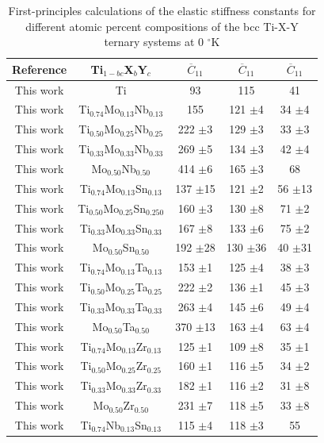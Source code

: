 \newpage
\begin{longtable}[H]{ c c c c c}
	\caption{First-principles calculations of the elastic stiffness constants for different atomic percent compositions of the bcc Ti-X-Y ternary systems at 0 $^{\circ}$K} 	\label{Ch6-table:tixyecijdata} \\
	\hline
	Reference & Ti$_{1-bc}$X$_b$Y$_c$ & $\overline{C}_{11}$ & $\overline{C}_{11}$ & $\overline{C}_{11}$ \\
	\hline
	\endhead
	\hline
	\endfoot
	This work & Ti & 93 & 115 & 41 \\
	This work & Ti$_{0.74}$Mo$_{0.13}$Nb$_{0.13}$ & 155 & 121 $\pm$4 & 34 $\pm$4 \\
	This work & Ti$_{0.50}$Mo$_{0.25}$Nb$_{0.25}$ & 222 $\pm$3 & 129 $\pm$3 & 33 $\pm$3 \\
	This work & Ti$_{0.33}$Mo$_{0.33}$Nb$_{0.33}$ & 269 $\pm$5 & 134 $\pm$3 & 42 $\pm$4 \\
	This work & Mo$_{0.50}$Nb$_{0.50}$ & 414 $\pm$6 & 165 $\pm$3 & 68 \\
	This work & Ti$_{0.74}$Mo$_{0.13}$Sn$_{0.13}$ & 137 $\pm$15 & 121 $\pm$2 & 56 $\pm$13 \\
	This work & Ti$_{0.50}$Mo$_{0.25}$Sn$_{0.250}$ & 160 $\pm$3 & 130 $\pm$8 & 71 $\pm$2 \\
	This work & Ti$_{0.33}$Mo$_{0.33}$Sn$_{0.33}$ & 167 $\pm$8 & 133 $\pm$6 & 75 $\pm$2 \\
	This work & Mo$_{0.50}$Sn$_{0.50}$ & 192 $\pm$28 & 130 $\pm$36 & 40 $\pm$31 \\
	This work & Ti$_{0.74}$Mo$_{0.13}$Ta$_{0.13}$ & 153 $\pm$1 & 125 $\pm$4 & 38 $\pm$3 \\
	This work & Ti$_{0.50}$Mo$_{0.25}$Ta$_{0.25}$ & 222 $\pm$2 & 136 $\pm$1 & 45 $\pm$3 \\
	This work & Ti$_{0.33}$Mo$_{0.33}$Ta$_{0.33}$ & 263 $\pm$4 & 145 $\pm$6 & 49 $\pm$4 \\
	This work & Mo$_{0.50}$Ta$_{0.50}$ & 370 $\pm$13 & 163 $\pm$4 & 63 $\pm$4 \\
	This work & Ti$_{0.74}$Mo$_{0.13}$Zr$_{0.13}$ & 125 $\pm$1 & 109 $\pm$8 & 35 $\pm$1 \\
	This work & Ti$_{0.50}$Mo$_{0.25}$Zr$_{0.25}$ & 160 $\pm$1 & 116 $\pm$5 & 34 $\pm$2 \\
	This work & Ti$_{0.33}$Mo$_{0.33}$Zr$_{0.33}$ & 182 $\pm$1 & 116 $\pm$2 & 31 $\pm$8 \\
	This work & Mo$_{0.50}$Zr$_{0.50}$ & 231 $\pm$7 & 118 $\pm$5 & 33 $\pm$8 \\
	This work & Ti$_{0.74}$Nb$_{0.13}$Sn$_{0.13}$ & 115 $\pm$4 & 118 $\pm$3 & 55 \\

\end{longtable}
